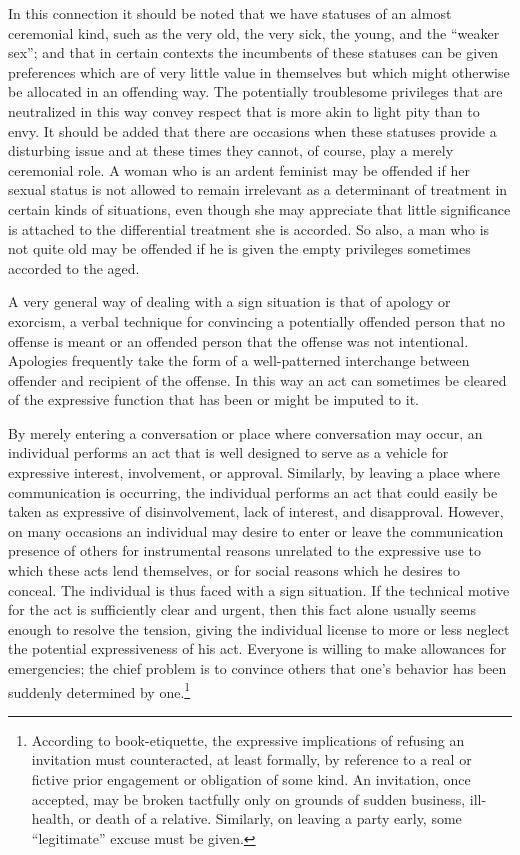 \documentclass[openany,nobib]{tufte-book}
\begin{document}
In this connection it should be noted that we have statuses of an almost
ceremonial kind, such as the very old, the very sick, the young, and the
``weaker sex''; and that in certain contexts the incumbents of these
statuses can be given preferences which are of very little value in
themselves but which might otherwise be allocated in an offending way.
The potentially troublesome privileges that are neutralized in this way
convey respect that is more akin to light pity than to envy. It should
be added that there are occasions when these statuses provide a
disturbing issue and at these times they cannot, of course, play a
merely ceremonial role. A woman who is an ardent feminist may be
offended if her sexual status is not allowed to remain irrelevant as a
determinant of treatment in certain kinds of situations, even though she
may appreciate that little significance is attached to the differential
treatment she is accorded. So also, a man who is not quite old may be
offended if he is given the empty privileges sometimes accorded to the
aged.

A very general way of dealing with a sign situation is that of apology
or exorcism, a verbal technique for convincing a potentially offended
person that no offense is meant or an offended person that the offense
was not intentional. Apologies frequently take the form of a
well-patterned interchange between offender and recipient of the
offense. In this way an act can sometimes be cleared of the expressive
function that has been or might be imputed to it.

By merely entering a conversation or place where conversation may occur,
an individual performs an act that is well designed to serve as a
vehicle for expressive interest, involvement, or approval. Similarly, by
leaving a place where communication is occurring, the individual
performs an act that could easily be taken as expressive of
disinvolvement, lack of interest, and disapproval. However, on many
occasions an individual may desire to enter or leave the communication
presence of others for instrumental reasons unrelated to the expressive
use to which these acts lend themselves, or for social reasons which he
desires to conceal. The individual is thus faced with a sign situation.
If the technical motive for the act is sufficiently clear and urgent,
then this fact alone usually seems enough to resolve the tension, giving
the individual license to more or less neglect the potential
expressiveness of his act. Everyone is willing to make allowances for
emergencies; the chief problem is to convince others that one's behavior
has been suddenly determined by one.\footnote{According to
  book-etiquette, the expressive implications of refusing an invitation
  must counteracted, at least formally, by reference to a real or
  fictive prior engagement or obligation of some kind. An invitation,
  once accepted, may be broken tactfully only on grounds of sudden
  business, ill-health, or death of a relative. Similarly, on leaving a
  party early, some ``legitimate'' excuse must be given.}
\end{document}
